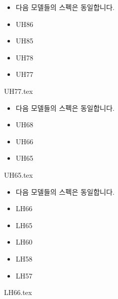 \documentclass{beamer}
\begin{document}






\begin{frame}[t]{}
\tableofcontents
\huge
\begin{itemize}
\large \item 다음 모델들의 스펙은 동일합니다.
\huge \item UH86
\huge \item UH85
\huge \item UH78
\huge \item UH77
\end{itemize}
\end{frame}

{UH77.tex}


\begin{frame}[t]{}
\tableofcontents
\huge
\begin{itemize}
\large \item 다음 모델들의 스펙은 동일합니다.
\huge \item UH68
\huge \item UH66
\huge \item UH65
\end{itemize}
\end{frame}

{UH65.tex}





\begin{frame}[t]{}
\tableofcontents
\huge
\begin{itemize}
\large \item 다음 모델들의 스펙은 동일합니다.
\huge \item LH66
\huge \item LH65
\huge \item LH60
\huge \item LH58
\huge \item LH57
\end{itemize}
\end{frame}

{LH66.tex}
\end{document}

